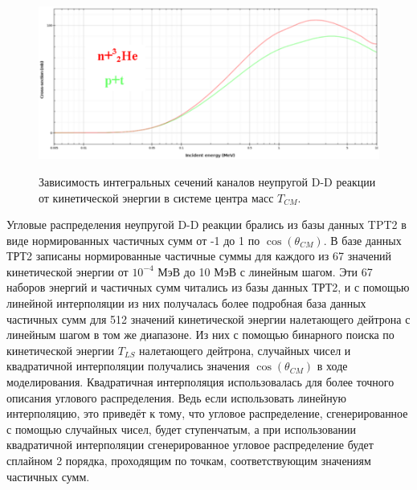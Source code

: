 \documentclass[a4paper,12pt]{article}
\begin{document}
\begin{large}
\begin{figure}[ht]
  {
     \includegraphics[width=0.99\linewidth]{images/DDInelasticIntegralCrossSections.pdf}
  }
  \caption{Зависимость интегральных сечений каналов неупругой D-D реакции от кинетической энергии в системе центра масс $T_{CM}$.}
  \label{fig:InelasticDDIntegralCrossSections}
\end{figure}	
	
	
	Угловые распределения неупругой D-D реакции брались из базы данных TPT2 в виде нормированных частичных сумм от -1 до 1 по $\cos{ \left( \theta_{CM} \right) }$.
	В базе данных ТРТ2 записаны нормированные частичные суммы для каждого из 67 значений кинетической энергии от $10^{-4}$ МэВ до 10 МэВ с линейным шагом.
	Эти 67 наборов энергий и частичных сумм читались из базы данных ТРТ2, и с помощью линейной интерполяции из них получалась более подробная база данных частичных сумм для 512 значений кинетической энергии налетающего дейтрона с линейным шагом в том же диапазоне.
	Из них с помощью бинарного поиска по кинетической энергии $T_{LS}$ налетающего дейтрона, случайных чисел и квадратичной интерполяции получались значения $\cos{ \left( \theta_{CM} \right) }$ в ходе моделирования.
	Квадратичная интерполяция использовалась для более точного описания углового распределения.
	Ведь если использовать линейную интерполяцию, это приведёт к тому, что угловое распределение, сгенерированное с помощью случайных чисел, будет ступенчатым, а при использовании квадратичной интерполяции сгенерированное угловое распределение будет сплайном 2 порядка, проходящим по точкам, соответствующим значениям частичных сумм.
	

\end{large}
\end{document}
